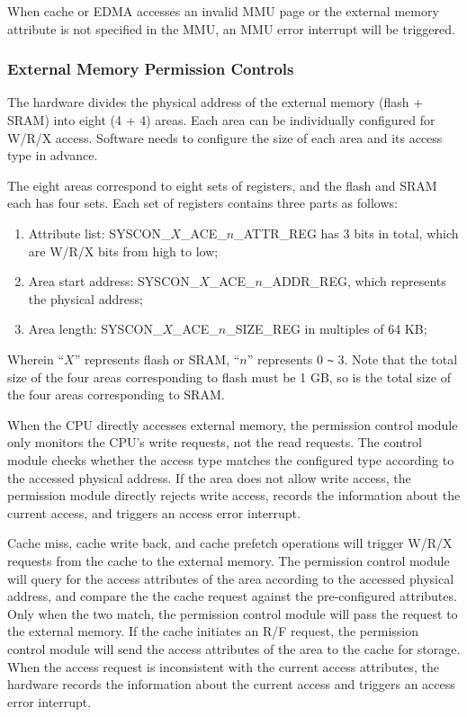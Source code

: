 \documentclass[main\_\_EN.tex]{subfiles}
\begin{document}
When cache or EDMA accesses an invalid MMU page or the external memory attribute is not specified in the MMU, an MMU error interrupt will be triggered.

\subsubsection{External Memory Permission Controls}\label{External Memory Permission Controls}
The hardware divides the physical address of the external memory (flash + SRAM) into eight (4 + 4) areas. Each area can be individually configured for W/R/X access. Software needs to configure the size of each area and its access type in advance.

The eight areas correspond to eight sets of registers, and the flash and SRAM each has four sets. Each set of registers contains three parts as follows:
\begin{enumerate}
    \item Attribute list: SYSCON\_${X}$\_ACE\_${n}$\_ATTR\_REG has 3 bits in total, which are W/R/X bits from high to low;
    \item Area start address: SYSCON\_${X}$\_ACE\_${n}$\_ADDR\_REG, which represents the physical address;
    \item Area length:  SYSCON\_${X}$\_ACE\_${n}$\_SIZE\_REG in multiples of 64 KB;
\end{enumerate}
Wherein “${X}$” represents flash or SRAM, “${n}$” represents 0 \verb+~+ 3. Note that the total size of the four areas corresponding to flash must be 1 GB, so is the total size of the four areas corresponding to SRAM.

When the CPU directly accesses external memory, the permission control module only monitors the CPU's write requests, not the read requests. The control module checks whether the access type matches the configured type according to the accessed physical address. If the area does not allow write access, the permission module directly rejects write access, records the information about the current access, and triggers an access error interrupt.

Cache miss, cache write back, and cache prefetch operations will trigger W/R/X requests from the cache to the external memory. The permission control module will query for the access attributes of the area according to the accessed physical address, and compare the the cache request against the pre-configured attributes. Only when the two match, the permission control module will pass the request to the external memory. If the cache initiates an R/F request, the permission control module will send the access attributes of the area to the cache for storage. When the access request is inconsistent with the current access attributes, the hardware records the information about the current access and triggers an access error interrupt.
\end{document}

